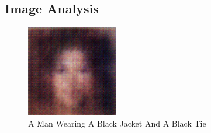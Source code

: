 \documentclass{article}%
\begin{document}
%
\subsection{Image Analysis}%
\label{subsec:ImageAnalysis}%


\begin{figure}[h!]%
\centering%
\includegraphics[width=150px]{500_fake_images/samples_5_83.png}%
\caption{A Man Wearing A Black Jacket And A Black Tie}%
\end{figure}

%
\end{document}
